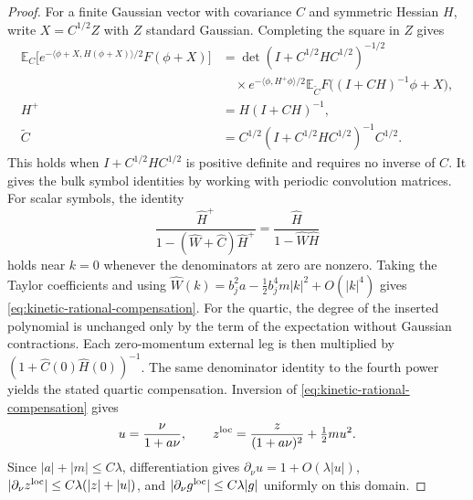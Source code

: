 \documentclass[11pt]{article}
\theoremstyle{definition}
\newcommand{\E}{\mathbb E}
\begin{document}
\begin{proof}
For a finite Gaussian vector with covariance \(C\) and
symmetric Hessian \(H\), write \(X=C^{1/2}Z\) with \(Z\)
standard Gaussian. Completing the square in \(Z\) gives
\begin{equation}
\begin{aligned}
 \E_C\!\Big[e^{-\langle\phi+X,H(\phi+X)\rangle/2}
                    F(\phi+X)\Big]
 &=\det(I+C^{1/2}HC^{1/2})^{-1/2} \\
 &\quad\times e^{-\langle\phi,H^+\phi\rangle/2}
   \E_{\widetilde C}F\big((I+CH)^{-1}\phi+X\big),\\
 H^+&=H(I+CH)^{-1},\\
 \widetilde C&=C^{1/2}(I+C^{1/2}HC^{1/2})^{-1}C^{1/2}.
\end{aligned}
\label{eq:kinetic-heat}
\end{equation}
This holds when \(I+C^{1/2}HC^{1/2}\) is positive definite
and requires no inverse of \(C\). It gives the bulk symbol
identities by working with periodic convolution matrices.
For scalar symbols, the identity
\begin{equation}
 \frac{\widehat H^+}{1-(\widehat W+\widehat C)\widehat H^+}
 =\frac{\widehat H}{1-\widehat W\widehat H}
\end{equation}
holds near \(k=0\) whenever the denominators at zero are
nonzero. Taking the Taylor coefficients and using
\(\widehat W(k)=b_j^2a-\tfrac12 b_j^4m|k|^2+O(|k|^4)\)
gives \eqref{eq:kinetic-rational-compensation}. For the
quartic, the degree of the inserted polynomial is unchanged
only by the term of the expectation without Gaussian
contractions. Each zero-momentum external leg is then
multiplied by
\((1+\widehat C(0)\widehat H(0))^{-1}\).
The same denominator identity to the fourth power yields
the stated quartic compensation. Inversion of
\eqref{eq:kinetic-rational-compensation} gives
\begin{equation}
 u=\frac{\nu}{1+a\nu},\qquad
 z^{\rm loc}=\frac{z}{(1+a\nu)^2}+\tfrac12 m u^2.
\end{equation}
Since \(|a|+|m|\le C\lambda\), differentiation gives
\(\partial_\nu u=1+O(\lambda|u|)\),
\(|\partial_\nu z^{\rm loc}|\le C\lambda(|z|+|u|)\), and
\(|\partial_\nu g^{\rm loc}|\le C\lambda|g|\) uniformly on
this domain.
\end{proof}
\end{document}
